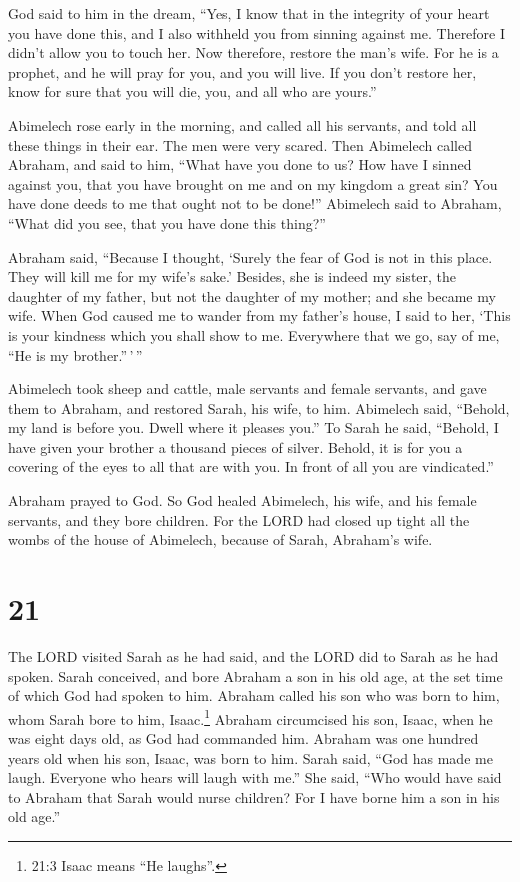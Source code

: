  God said to him in the dream, ``Yes, I know that in the
integrity of your heart you have done this, and I also withheld you from
sinning against me. Therefore I didn't allow you to touch her.
 Now therefore, restore the man's wife. For he is a prophet,
and he will pray for you, and you will live. If you don't restore her,
know for sure that you will die, you, and all who are yours.''

 Abimelech rose early in the morning, and called all his
servants, and told all these things in their ear. The men were very
scared.  Then Abimelech called Abraham, and said to him,
``What have you done to us? How have I sinned against you, that you have
brought on me and on my kingdom a great sin? You have done deeds to me
that ought not to be done!''  Abimelech said to Abraham,
``What did you see, that you have done this thing?''

 Abraham said, ``Because I thought, `Surely the fear of God
is not in this place. They will kill me for my wife's sake.'
 Besides, she is indeed my sister, the daughter of my
father, but not the daughter of my mother; and she became my wife.
 When God caused me to wander from my father's house, I
said to her, `This is your kindness which you shall show to me.
Everywhere that we go, say of me, ``He is my brother.''\,'\,''

 Abimelech took sheep and cattle, male servants and female
servants, and gave them to Abraham, and restored Sarah, his wife, to
him.  Abimelech said, ``Behold, my land is before you.
Dwell where it pleases you.''  To Sarah he said, ``Behold,
I have given your brother a thousand pieces of silver. Behold, it is for
you a covering of the eyes to all that are with you. In front of all you
are vindicated.''

 Abraham prayed to God. So God healed Abimelech, his wife,
and his female servants, and they bore children.  For the
LORD had closed up tight all the wombs of the house of Abimelech,
because of Sarah, Abraham's wife.

\hypertarget{section-20}{%
\section{21}\label{section-20}}

 The LORD visited Sarah as he had said, and the LORD did to
Sarah as he had spoken.  Sarah conceived, and bore Abraham a
son in his old age, at the set time of which God had spoken to him.
 Abraham called his son who was born to him, whom Sarah bore
to him, Isaac.\footnote{21:3 Isaac means ``He laughs''.} 
Abraham circumcised his son, Isaac, when he was eight days old, as God
had commanded him.  Abraham was one hundred years old when
his son, Isaac, was born to him.  Sarah said, ``God has made
me laugh. Everyone who hears will laugh with me.''  She
said, ``Who would have said to Abraham that Sarah would nurse children?
For I have borne him a son in his old age.''

